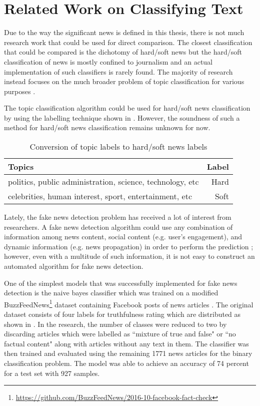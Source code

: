 \section{Related Work on Classifying Text} \label{related_works}
Due to the way the significant news is defined in this thesis, there is not much research work that could be used for direct comparison. The closest classification that could be compared is the dichotomy of hard/soft news but the hard/soft classification of news is mostly confined to journalism and an actual implementation of such classifiers is rarely found. The majority of research instead focuses on the much broader problem of topic classification for various purposes \cite{wang2012baselines, lee2011twitter, joachims1998text, nigam2000text}.

The topic classification algorithm could be used for hard/soft news classification by using the labelling technique shown in . However, the soundness of such a method for hard/soft news classification remains unknown for now.

\begin{table}[h]
\begin{center}
\caption{Conversion of topic labels to hard/soft news labels}
\label{tbl:topics_to_hard_soft}
\begin{tabular}{lr}
\toprule 
Topics&Label \\
\midrule 
politics, public administration, science, technology, etc & Hard\\
\hline
celebrities, human interest, sport, entertainment, etc & Soft\\
\bottomrule
\end{tabular}
\end{center}
\end{table}

Lately, the fake news detection problem has received a lot of interest from researchers. A fake news detection algorithm could use any combination of information among news content, social content (e.g. user's engagement), and dynamic information (e.g. news propagation) in order to perform the prediction \cite{shu2018fakenewsnet}; however, even with a multitude of such information, it is not easy to construct an automated algorithm for fake news detection\cite{shu2017fake}.

One of the simplest models that was successfully implemented for fake news detection is the naive bayes classifier which was trained on a modified BuzzFeedNews\footnote{\url{https://github.com/BuzzFeedNews/2016-10-facebook-fact-check}} dataset containing Facebook posts of news articles \cite{granik2017fake}. The original dataset consists of four labels for truthfulness rating which are distributed as shown in . In the research, the number of classes were reduced to two by discarding articles which were labelled as ``mixture of true and false" or ``no factual content" along with articles without any text in them. The classifier was then trained and evaluated using the remaining 1771 news articles for the binary classification problem. The model was able to achieve an accuracy of 74 percent for a test set with 927 samples.

